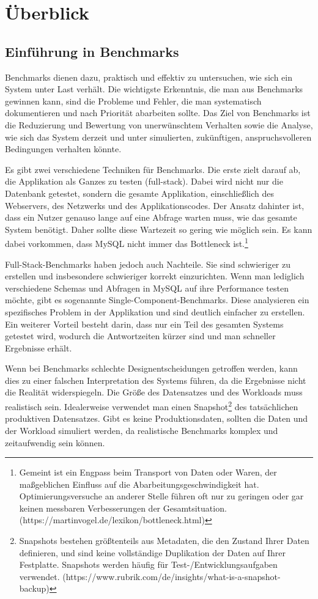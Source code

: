 \chapter{Überblick}

\section{Einführung in Benchmarks}

Benchmarks dienen dazu, praktisch und effektiv zu untersuchen, wie sich ein
System unter Last verhält. Die wichtigste Erkenntnis, die man aus Benchmarks
gewinnen kann, sind die Probleme und Fehler, die man systematisch dokumentieren
und nach Priorität abarbeiten sollte. Das Ziel von Benchmarks ist die Reduzierung
und Bewertung von unerwünschtem Verhalten sowie die Analyse, wie sich das
System derzeit und unter simulierten, zukünftigen, anspruchsvolleren Bedingungen
verhalten könnte.

Es gibt zwei verschiedene Techniken für Benchmarks. Die erste zielt darauf ab,
die Applikation als Ganzes zu testen (full-stack). Dabei wird nicht nur die
Datenbank getestet, sondern die gesamte Applikation, einschließlich des Webservers,
des Netzwerks und des Applikationscodes. Der Ansatz dahinter ist, dass ein Nutzer
genauso lange auf eine Abfrage warten muss, wie das gesamte System benötigt.
Daher sollte diese Wartezeit so gering wie möglich sein. Es kann dabei vorkommen,
dass MySQL nicht immer das Bottleneck ist.\footnote{Gemeint ist ein Engpass beim Transport von Daten oder Waren, der maßgeblichen Einfluss auf die Abarbeitungsgeschwindigkeit hat. Optimierungsversuche an anderer Stelle führen oft nur zu geringen oder gar keinen messbaren Verbesserungen der Gesamtsituation. (https://martinvogel.de/lexikon/bottleneck.html)}

Full-Stack-Benchmarks haben jedoch auch Nachteile. Sie sind schwieriger zu erstellen
und insbesondere schwieriger korrekt einzurichten. Wenn man lediglich verschiedene
Schemas und Abfragen in MySQL auf ihre Performance testen möchte, gibt es sogenannte
Single-Component-Benchmarks. Diese analysieren ein spezifisches Problem in der
Applikation und sind deutlich einfacher zu erstellen. Ein weiterer Vorteil besteht
darin, dass nur ein Teil des gesamten Systems getestet wird, wodurch die Antwortzeiten
kürzer sind und man schneller Ergebnisse erhält.

Wenn bei Benchmarks schlechte Designentscheidungen getroffen werden, kann dies zu einer
falschen Interpretation des Systems führen, da die Ergebnisse nicht die Realität widerspiegeln.
Die Größe des Datensatzes und des Workloads muss realistisch sein. Idealerweise verwendet
man einen Snapshot\footnote{Snapshots bestehen größtenteils aus Metadaten, die den Zustand Ihrer Daten definieren, und sind keine vollständige Duplikation der Daten auf Ihrer Festplatte. Snapshots werden häufig für Test-/Entwicklungsaufgaben verwendet. (https://www.rubrik.com/de/insights/what-is-a-snapshot-backup) } des tatsächlichen produktiven Datensatzes.
Gibt es keine Produktionsdaten, sollten die Daten und der Workload simuliert werden,
da realistische Benchmarks komplex und zeitaufwendig sein können.


